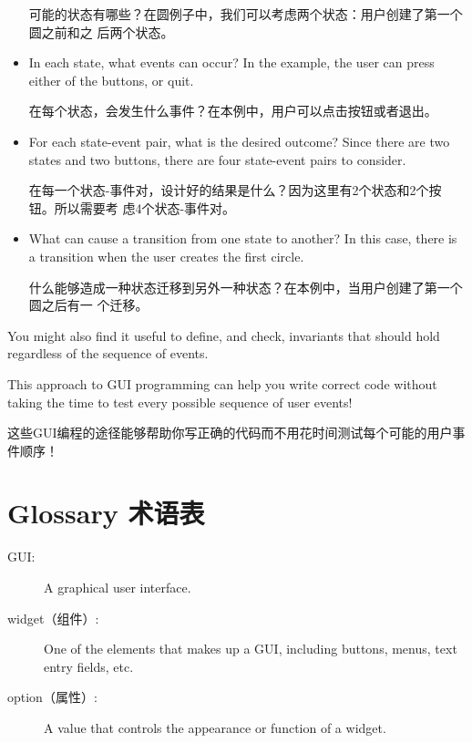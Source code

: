 \documentclass[10pt]{book}
\begin{document}
\begin{CJK}{UTF8}{gbsn}
\begin{itemize}
可能的状态有哪些？在圆例子中，我们可以考虑两个状态：用户创建了第一个圆之前和之
后两个状态。

\item In each state, what events can occur?  In the example,
the user can press either of the buttons, or quit.

在每个状态，会发生什么事件？在本例中，用户可以点击按钮或者退出。

\item For each state-event pair, what is the desired outcome?
Since there are two states and two buttons, there are four
state-event pairs to consider.

在每一个状态-事件对，设计好的结果是什么？因为这里有2个状态和2个按钮。所以需要考
虑4个状态-事件对。

\item What can cause a transition from one state to another?
In this case, there is a transition when the user creates
the first circle.

什么能够造成一种状态迁移到另外一种状态？在本例中，当用户创建了第一个圆之后有一
个迁移。

\end{itemize}

You might also find it useful to define, and check, invariants that
should hold regardless of the sequence of events.


This approach to GUI programming can help you write correct
code without taking the time to test every possible sequence
of user events!

这些GUI编程的途径能够帮助你写正确的代码而不用花时间测试每个可能的用户事件顺序！


\section{Glossary 术语表}

\begin{description}

\item[GUI:] A graphical user interface.

\item[widget（组件）:] One of the elements that makes up a GUI, including
buttons, menus, text entry fields, etc. 

\item[option（属性）:] A value that controls the appearance or function of
a widget.


\end{description}
\end{CJK}
\end{document}

